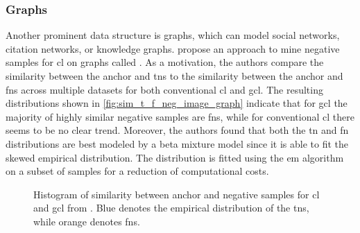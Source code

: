 \subsubsection{Graphs}\label{subsec:graph_distribution}

Another prominent data structure is graphs, which can model 
social networks, citation networks, or knowledge graphs.
\citet{progcl_2022} propose an approach to mine negative samples for \ac{cl} on graphs called \progcl{}. 
As a motivation, the authors compare the similarity between the anchor and \acp{tn} 
to the similarity between the anchor and \acp{fn} 
across multiple datasets for both conventional \ac{cl} and \ac{gcl}.
The resulting distributions shown in \autoref{fig:sim_t_f_neg_image_graph} 
indicate that for \ac{gcl} the majority of highly similar negative samples are \acp{fn}, 
while for conventional \ac{cl} there seems to be no clear trend.
Moreover, the authors found that both the \ac{tn} and \ac{fn} distributions are best modeled by a beta mixture model %
since it is able to fit the skewed empirical distribution.
The distribution is fitted using the \ac{em} algorithm on a subset of samples for a reduction of computational costs.

\begin{figure}%
    \centering
    \qquad
    \caption{Histogram of similarity between anchor and negative samples for \ac{cl} and \ac{gcl} from \citet{progcl_2022}.
    Blue denotes the empirical distribution of the \acp{tn}, while orange denotes \acp{fn}.}%
    \label{fig:sim_t_f_neg_image_graph}%
\end{figure}

